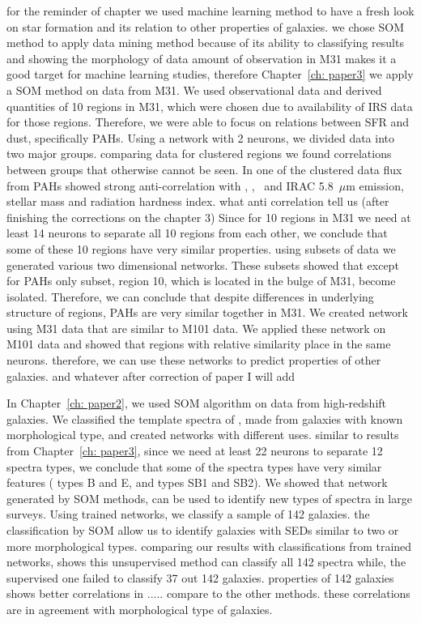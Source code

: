 for the reminder of chapter we used machine learning method to have a fresh look on star formation and its relation to other properties of galaxies.
we chose SOM method to apply data mining method because of its ability to classifying results and showing the morphology of data
amount of observation in M31 makes it a good target for machine learning studies, therefore Chapter~\ref{ch: paper3} we apply a SOM method on data from M31.
We used observational data and derived quantities of 10 regions in M31, which were chosen due to availability of IRS data for those regions.
Therefore, we were able to focus on relations between SFR and dust, specifically PAHs.
Using a network with 2 neurons, we divided data into two major groups.
comparing data for clustered regions we found correlations between groups that otherwise cannot be seen.
In one of the clustered data flux from PAHs showed strong anti-correlation with \halpha, \sii, \oiii~and IRAC 5.8~$\mu$m emission, stellar mass and radiation hardness index.
what anti correlation tell us (after finishing the corrections on the chapter 3)
Since for 10 regions in M31 we need at least 14 neurons to separate all 10 regions from each other, we conclude that some of these 10 regions have very similar properties.
using subsets of data we generated various two dimensional networks.
These subsets showed that except for PAHs only subset, region 10, which is located in the bulge of M31, become isolated.
Therefore, we can conclude that despite differences in underlying structure of regions, PAHs are very similar together in M31.
We created network using M31 data that are similar to M101 data.
We applied these network on M101 data and showed that regions with relative similarity place in the same neurons.
therefore, we can use these networks to predict properties of other galaxies.
and whatever after correction of paper I will add

In Chapter~\ref{ch: paper2}, we used SOM algorithm on data from high-redshift galaxies.
We classified the template spectra of \citet{Kinney96}, made from galaxies with known morphological type, and created networks with different uses.
similar to results from Chapter~\ref{ch: paper3}, since we need at least 22 neurons to separate 12 spectra types, we conclude that some of the spectra types have very similar features (\citet{Kinney96} types B and E, and types SB1 and SB2).
We showed that network generated by SOM methods, can be used to identify new types of spectra in large surveys.
Using trained networks, we classify a sample of 142 galaxies.
the classification by SOM allow us to identify galaxies with SEDs similar to two or more morphological types.
comparing our results with classifications from trained networks, shows this unsupervised method can classify all 142 spectra while, the supervised one failed to classify 37 out 142 galaxies. 
properties of 142 galaxies shows better correlations in ..... compare to the other methods.
these correlations are in agreement with morphological type of galaxies.

